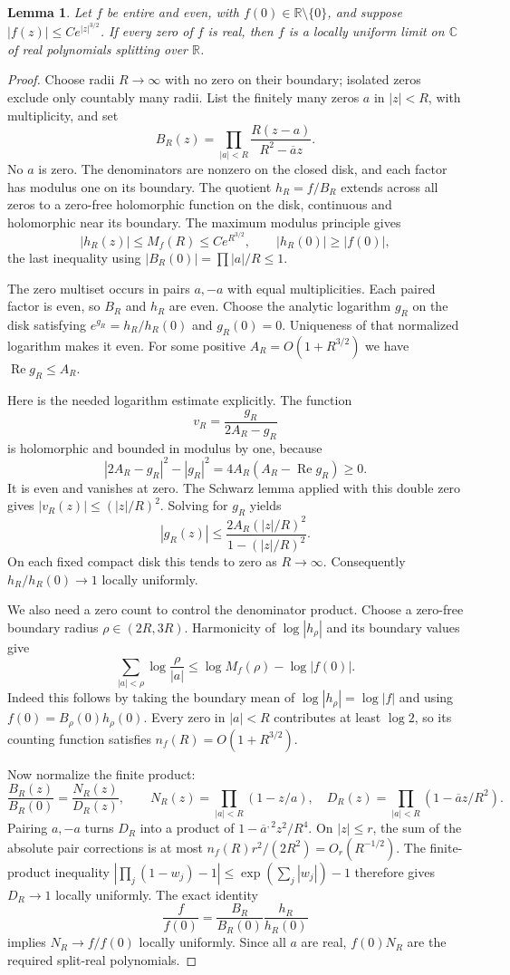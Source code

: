\documentclass[11pt]{article}
\newtheorem{lemma}[theorem]{Lemma}
\theoremstyle{remark}\newtheorem{remark}[theorem]{Remark}
\newcommand{\R}{\mathbb R}\newcommand{\C}{\mathbb C}
\DeclareMathOperator{\Rea}{Re}\DeclareMathOperator{\Ima}{Im}
\begin{document}
\begin{lemma}\label{lem:polynomial}
Let $f$ be entire and even, with $f(0)\in\R\setminus\{0\}$,
and suppose $|f(z)|\leq Ce^{|z|^{3/2}}$. If every zero of $f$
is real, then $f$ is a locally uniform limit on $\C$ of real
polynomials splitting over $\R$.
\end{lemma}
\begin{proof}
Choose radii $R\to\infty$ with no zero on their boundary;
isolated zeros exclude only countably many radii. List the
finitely many zeros $a$ in $|z|<R$, with multiplicity, and set
\[
 B_R(z)=\prod_{|a|<R}\frac{R(z-a)}{R^2-\overline a z}.
\]
No $a$ is zero. The denominators are nonzero on the closed
disk, and each factor has modulus one on its boundary.
The quotient $h_R=f/B_R$ extends across all zeros to a
zero-free holomorphic function on the disk, continuous and
holomorphic near its boundary. The maximum modulus principle gives
\[
 |h_R(z)|\leq M_f(R)\leq Ce^{R^{3/2}},\qquad
 |h_R(0)|\geq|f(0)|,
\]
the last inequality using $|B_R(0)|=\prod|a|/R\leq1$.

The zero multiset occurs in pairs $a,-a$ with equal
multiplicities. Each paired factor is even, so $B_R$ and $h_R$
are even. Choose the analytic logarithm $g_R$ on the disk
satisfying $e^{g_R}=h_R/h_R(0)$ and $g_R(0)=0$.
Uniqueness of that normalized logarithm makes it even.
For some positive $A_R=O(1+R^{3/2})$ we have
$\Rea g_R\leq A_R$.

Here is the needed logarithm estimate explicitly. The function
\[
 v_R=\frac{g_R}{2A_R-g_R}
\]
is holomorphic and bounded in modulus by one, because
\[
 |2A_R-g_R|^2-|g_R|^2
                         =4A_R(A_R-\Rea g_R)\geq0.
\]
It is even and vanishes at zero. The Schwarz lemma applied
with this double zero gives $|v_R(z)|\leq(|z|/R)^2$.
Solving for $g_R$ yields
\[
 |g_R(z)|\leq\frac{2A_R(|z|/R)^2}{1-(|z|/R)^2}.
\]
On each fixed compact disk this tends to zero as $R\to\infty$.
Consequently $h_R/h_R(0)\to1$ locally uniformly.

We also need a zero count to control the denominator product.
Choose a zero-free boundary radius $\rho\in(2R,3R)$. Harmonicity
of $\log|h_\rho|$ and its boundary values give
\[
 \sum_{|a|<\rho}\log\frac{\rho}{|a|}
 \leq\log M_f(\rho)-\log|f(0)|.
\]
Indeed this follows by taking the boundary mean of
$\log|h_\rho|=\log|f|$ and using
$f(0)=B_\rho(0)h_\rho(0)$. Every zero in $|a|<R$ contributes
at least $\log2$, so its counting function satisfies
$n_f(R)=O(1+R^{3/2})$.

Now normalize the finite product:
\[
 \frac{B_R(z)}{B_R(0)}=\frac{N_R(z)}{D_R(z)},\qquad
 N_R(z)=\prod_{|a|<R}(1-z/a),\quad
 D_R(z)=\prod_{|a|<R}(1-\overline a z/R^2).
\]
Pairing $a,-a$ turns $D_R$ into a product of
$1-\overline a^{,2}z^2/R^4$. On $|z|\leq r$, the sum of the
absolute pair corrections is at most
$n_f(R)r^2/(2R^2)=O_r(R^{-1/2})$.
The finite-product inequality
$|\prod_j(1-w_j)-1|\leq\exp(\sum_j|w_j|)-1$ therefore gives
$D_R\to1$ locally uniformly. The exact identity
\[
 \frac f{f(0)}=\frac{B_R}{B_R(0)}\frac{h_R}{h_R(0)}
\]
implies $N_R\to f/f(0)$ locally uniformly. Since all $a$ are
real, $f(0)N_R$ are the required split-real polynomials.
\end{proof}
\end{document}

